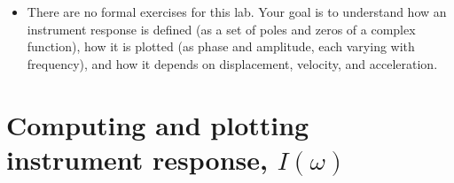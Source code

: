 \documentclass[11pt,titlepage,fleqn]{article}
\begin{document}
\begin{itemize}

\item There are no formal exercises for this lab. Your goal is to understand how an instrument response is defined (\eg as a set of poles and zeros of a complex function), how it is plotted (\eg as phase and amplitude, each varying with frequency), and how it depends on displacement, velocity, and acceleration.

\end{itemize}


\pagebreak
\section{Computing and plotting instrument response, $I(\omega)$}
\end{document}
